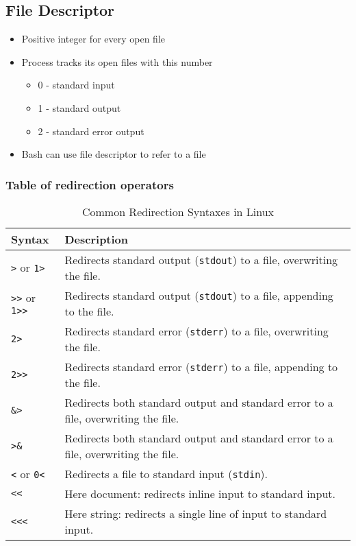 \documentclass{report}
\begin{document}
    \subsection{File Descriptor}
    \begin{itemize}
        \item Positive integer for every open file
        \item Process tracks its open files with this number
            \begin{itemize}
                \item 0 - standard input
                \item 1 - standard output
                \item 2 - standard error output
            \end{itemize}
        \item Bash can use file descriptor to refer to a file
    \end{itemize}

    \bigbreak \noindent 
    \subsubsection{Table of redirection operators}
    \bigbreak \noindent 
    \begin{table}[ht]
        \centering
        \caption{Common Redirection Syntaxes in Linux}
        \label{tab:redirection}
        \begin{tabular}{@{}ll@{}}
            \toprule
            Syntax      & Description                                           \\ \midrule
            \texttt{>} or \texttt{1>}  & Redirects standard output (\texttt{stdout}) to a file, overwriting the file. \\
            \texttt{>>} or \texttt{1>>} & Redirects standard output (\texttt{stdout}) to a file, appending to the file. \\
            \texttt{2>}  & Redirects standard error (\texttt{stderr}) to a file, overwriting the file. \\
            \texttt{2>>} & Redirects standard error (\texttt{stderr}) to a file, appending to the file. \\
            \texttt{\&>} & Redirects both standard output and standard error to a file, overwriting the file. \\
            \texttt{>\&} & Redirects both standard output and standard error to a file, overwriting the file. \\
            \texttt{<} or \texttt{0<}  & Redirects a file to standard input (\texttt{stdin}). \\
            \texttt{<<}  & Here document: redirects inline input to standard input. \\
            \texttt{<<<} & Here string: redirects a single line of input to standard input. \\
            \bottomrule
        \end{tabular}
    \end{table}
\end{document}
